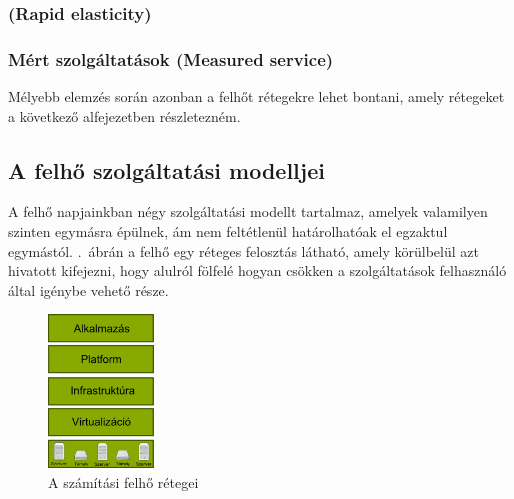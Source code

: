 \subsubsection{(\foreignlanguage{english}{Rapid elasticity})}

\subsubsection{Mért szolgáltatások (\foreignlanguage{english}{Measured service})}

Mélyebb elemzés során azonban a felhőt rétegekre lehet bontani, amely rétegeket a következő alfejezetben részletezném.

\subsection{A felhő szolgáltatási modelljei}

A felhő napjainkban négy szolgáltatási modellt tartalmaz, amelyek valamilyen szinten egymásra épülnek, ám nem feltétlenül határolhatóak el egzaktul egymástól. .~ábrán a felhő egy réteges felosztás látható, amely körülbelül azt hivatott kifejezni, hogy alulról fölfelé hogyan csökken a szolgáltatások felhasználó által igénybe vehető része.


\begin{figure}[h!]
\centering
\includegraphics[width=0.25\textwidth]{figures/cloud_retegek.png}
\caption{A számítási felhő rétegei \label{fig:cloud_retegek}}
\end{figure}

